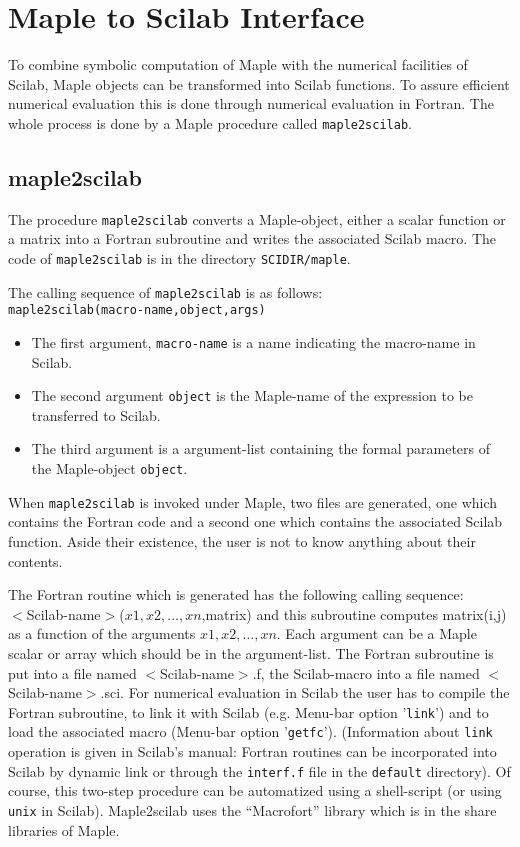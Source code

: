 
%
\chapter{Maple to Scilab Interface}
To combine symbolic computation of Maple with the numerical facilities
of Scilab, Maple objects can be transformed into Scilab functions. To assure 
efficient numerical evaluation this is done through numerical evaluation in 
Fortran. The whole process is done by a Maple procedure called 
\verb/maple2scilab/.
\section{maple2scilab}
The procedure \verb!maple2scilab! converts a Maple-object, 
either a scalar function or a matrix into a Fortran subroutine 
and writes the associated Scilab macro. The code of \verb!maple2scilab!
is in the directory \verb!SCIDIR/maple!.

The calling sequence of \verb!maple2scilab! is as follows:\\
\verb!maple2scilab(macro-name,object,args)!
\begin{itemize}
\item
The first argument, \verb!macro-name! is a name indicating the 
macro-name in Scilab.
\item
The second argument \verb!object! is the Maple-name of the expression 
to be transferred to Scilab.
\item
The third argument is a argument-list containing the formal parameters of
the Maple-object \verb!object!.
\end{itemize}
When \verb!maple2scilab! is invoked under Maple, two files are generated,
one which contains the Fortran code and a second one which contains the 
associated Scilab function. Aside their existence, the user is not to
know anything about their contents.

The Fortran routine which is generated has the following calling sequence:\\
$<$Scilab-name$>$($x1,x2,\ldots,xn$,matrix)
and this subroutine computes matrix(i,j) as a function of
the arguments $x1,x2,\ldots,xn$.
Each argument can be a Maple scalar or array which should be
in the argument-list. 
The Fortran subroutine is put into a file named $<$Scilab-name$>$.f, the
Scilab-macro into a file named $<$Scilab-name$>$.sci.
For numerical evaluation in Scilab the user has to compile the Fortran 
subroutine, to link it with Scilab (e.g. Menu-bar option '\verb!link!')
and to load the associated macro (Menu-bar option '\verb!getfc!').
(Information about \verb!link! operation is given in Scilab's manual: 
Fortran routines can be incorporated into Scilab by dynamic
link or through the \verb!interf.f! file in the \verb!default! directory).
 Of course, this two-step procedure can be automatized using a shell-script 
(or using \verb!unix! in Scilab).
Maple2scilab uses the ``Macrofort'' library which is in the share 
libraries of Maple.
